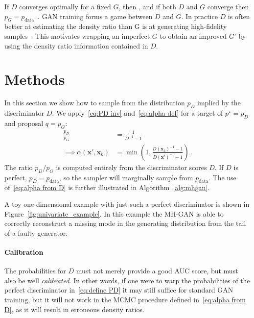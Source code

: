 \documentclass{article}
\renewcommand{\vec}[1]{{\boldsymbol{\mathbf{#1}}}} %
\newcommand{\target}{{p^\star}}
\newcommand{\prop}{q}
\newcommand{\PG}{{p_G}}
\newcommand{\PD}{{p_D}}
\newcommand{\PR}{{p_{\textrm{data}}}}
\newcommand{\accept}{\alpha}
\begin{document}
If $D$ converges optimally for a fixed $G$, then \smash{$D = \PR/(\PR + \PG)$}, and if both $D$ and $G$ converge then $\PG = \PR$~\citep{Goodfellow2014}.
GAN training forms a game between $D$ and $G$.
In practice $D$ is often better at estimating the density ratio than G is at generating high-fidelity samples~\citep{Shibuya2017}.
This motivates wrapping an imperfect $G$ to obtain an improved $G'$ by using the density ratio information contained in $D$.



\section{Methods}
\label{sec:Methods}

In this section we show how to sample from the distribution $\PD$ implied by the discriminator $D$.
We apply~\eqref{eq:PD inv} and~\eqref{eq:alpha def} for a target of $\target=\PD$ and proposal $\prop=\PG$:
\begin{align}
  \frac{\PD}{\PG} &= \frac{1}{D^{-1} - 1} \\
  \implies
  \accept(\vec x', \vec x_k) &= \min\left(1, \frac{D(\vec x_k)^{-1} - 1}{D(\vec x')^{-1} - 1}\right)\,. \label{eq:alpha from D}
\end{align}
The ratio $\PD/\PG$ is computed entirely from the discriminator scores $D$.
If $D$ is perfect, $\PD = \PR$, so the sampler will marginally sample from $\PR$.
The use of~\eqref{eq:alpha from D} is further illustrated in Algorithm~\ref{alg:mhgan}.

A toy one-dimensional example with just such a perfect discriminator is shown in Figure~\ref{fig:univariate_example}.
In this example the MH-GAN is able to correctly reconstruct a missing mode in the generating distribution from the tail of a faulty generator.

\paragraph{Calibration}
The probabilities for $D$ must not merely provide a good AUC score, but must also be well \emph{calibrated}.
In other words, if one were to warp the probabilities of the perfect discriminator in~\eqref{eq:define PD} it may still suffice for standard GAN training, but it will not work in the MCMC procedure defined in~\eqref{eq:alpha from D}, as it will result in erroneous density ratios.
\end{document}
